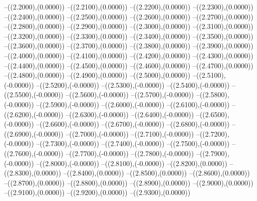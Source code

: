 {	--({\sx*(2.2000)},{\sy*(0.0000)})
	--({\sx*(2.2100)},{\sy*(0.0000)})
	--({\sx*(2.2200)},{\sy*(0.0000)})
	--({\sx*(2.2300)},{\sy*(0.0000)})
	--({\sx*(2.2400)},{\sy*(0.0000)})
	--({\sx*(2.2500)},{\sy*(0.0000)})
	--({\sx*(2.2600)},{\sy*(0.0000)})
	--({\sx*(2.2700)},{\sy*(0.0000)})
	--({\sx*(2.2800)},{\sy*(0.0000)})
	--({\sx*(2.2900)},{\sy*(0.0000)})
	--({\sx*(2.3000)},{\sy*(0.0000)})
	--({\sx*(2.3100)},{\sy*(0.0000)})
	--({\sx*(2.3200)},{\sy*(0.0000)})
	--({\sx*(2.3300)},{\sy*(0.0000)})
	--({\sx*(2.3400)},{\sy*(0.0000)})
	--({\sx*(2.3500)},{\sy*(0.0000)})
	--({\sx*(2.3600)},{\sy*(0.0000)})
	--({\sx*(2.3700)},{\sy*(0.0000)})
	--({\sx*(2.3800)},{\sy*(0.0000)})
	--({\sx*(2.3900)},{\sy*(0.0000)})
	--({\sx*(2.4000)},{\sy*(0.0000)})
	--({\sx*(2.4100)},{\sy*(0.0000)})
	--({\sx*(2.4200)},{\sy*(0.0000)})
	--({\sx*(2.4300)},{\sy*(0.0000)})
	--({\sx*(2.4400)},{\sy*(0.0000)})
	--({\sx*(2.4500)},{\sy*(0.0000)})
	--({\sx*(2.4600)},{\sy*(0.0000)})
	--({\sx*(2.4700)},{\sy*(0.0000)})
	--({\sx*(2.4800)},{\sy*(0.0000)})
	--({\sx*(2.4900)},{\sy*(0.0000)})
	--({\sx*(2.5000)},{\sy*(0.0000)})
	--({\sx*(2.5100)},{\sy*(-0.0000)})
	--({\sx*(2.5200)},{\sy*(-0.0000)})
	--({\sx*(2.5300)},{\sy*(-0.0000)})
	--({\sx*(2.5400)},{\sy*(-0.0000)})
	--({\sx*(2.5500)},{\sy*(-0.0000)})
	--({\sx*(2.5600)},{\sy*(-0.0000)})
	--({\sx*(2.5700)},{\sy*(-0.0000)})
	--({\sx*(2.5800)},{\sy*(-0.0000)})
	--({\sx*(2.5900)},{\sy*(-0.0000)})
	--({\sx*(2.6000)},{\sy*(-0.0000)})
	--({\sx*(2.6100)},{\sy*(-0.0000)})
	--({\sx*(2.6200)},{\sy*(-0.0000)})
	--({\sx*(2.6300)},{\sy*(-0.0000)})
	--({\sx*(2.6400)},{\sy*(-0.0000)})
	--({\sx*(2.6500)},{\sy*(-0.0000)})
	--({\sx*(2.6600)},{\sy*(-0.0000)})
	--({\sx*(2.6700)},{\sy*(-0.0000)})
	--({\sx*(2.6800)},{\sy*(-0.0000)})
	--({\sx*(2.6900)},{\sy*(-0.0000)})
	--({\sx*(2.7000)},{\sy*(-0.0000)})
	--({\sx*(2.7100)},{\sy*(-0.0000)})
	--({\sx*(2.7200)},{\sy*(-0.0000)})
	--({\sx*(2.7300)},{\sy*(-0.0000)})
	--({\sx*(2.7400)},{\sy*(-0.0000)})
	--({\sx*(2.7500)},{\sy*(-0.0000)})
	--({\sx*(2.7600)},{\sy*(-0.0000)})
	--({\sx*(2.7700)},{\sy*(-0.0000)})
	--({\sx*(2.7800)},{\sy*(-0.0000)})
	--({\sx*(2.7900)},{\sy*(-0.0000)})
	--({\sx*(2.8000)},{\sy*(-0.0000)})
	--({\sx*(2.8100)},{\sy*(-0.0000)})
	--({\sx*(2.8200)},{\sy*(0.0000)})
	--({\sx*(2.8300)},{\sy*(0.0000)})
	--({\sx*(2.8400)},{\sy*(0.0000)})
	--({\sx*(2.8500)},{\sy*(0.0000)})
	--({\sx*(2.8600)},{\sy*(0.0000)})
	--({\sx*(2.8700)},{\sy*(0.0000)})
	--({\sx*(2.8800)},{\sy*(0.0000)})
	--({\sx*(2.8900)},{\sy*(0.0000)})
	--({\sx*(2.9000)},{\sy*(0.0000)})
	--({\sx*(2.9100)},{\sy*(0.0000)})
	--({\sx*(2.9200)},{\sy*(0.0000)})
	--({\sx*(2.9300)},{\sy*(0.0000)})
}
